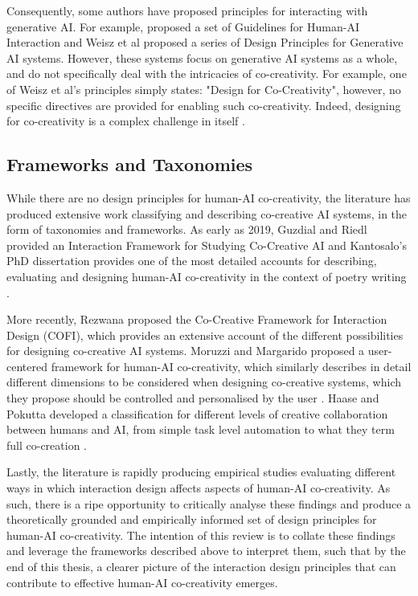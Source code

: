 Consequently, some authors have proposed principles for interacting with generative AI. For example, \cite{Amershi2019-wu} proposed a set of Guidelines for Human-AI Interaction and Weisz et al \cite{Weisz2024-io} proposed a series of Design Principles for Generative AI systems. However, these systems focus on generative AI systems as a whole, and do not specifically deal with the intricacies of co-creativity. For example, one of Weisz et al's principles simply states: "Design for Co-Creativity", however, no specific directives are provided for enabling such co-creativity. Indeed, designing for co-creativity is a complex challenge in itself \cite{Buschek2021-ks}. 

\subsection{Frameworks and Taxonomies}

While there are no design principles for human-AI co-creativity, the literature has produced extensive work classifying and describing co-creative AI systems, in the form of taxonomies and frameworks. As early as 2019, Guzdial and Riedl provided an Interaction Framework for Studying Co-Creative AI \cite{Guzdial2019-gr} and Kantosalo's PhD dissertation provides one of the most detailed accounts for describing, evaluating and designing human-AI co-creativity in the context of poetry writing \cite{Kantosalo2019-pz}. 

More recently, Rezwana \cite{Rezwana2022-gg} proposed the Co-Creative Framework for Interaction Design (COFI), which provides an extensive account of the different possibilities for designing co-creative AI systems. Moruzzi and Margarido proposed a user-centered framework for human-AI co-creativity, which similarly describes in detail different dimensions to be considered when designing co-creative systems, which they propose should be controlled and personalised by the user \cite{Moruzzi2024-cq}. Haase and Pokutta developed a classification for different levels of creative collaboration between humans and AI, from simple task level automation to what they term full co-creation \cite{Haase2024-yp}. 

Lastly, the literature is rapidly producing empirical studies evaluating different ways in which interaction design affects aspects of human-AI co-creativity. As such, there is a ripe opportunity to critically analyse these findings and produce a theoretically grounded and empirically informed set of design principles for human-AI co-creativity. The intention of this review is to collate these findings and leverage the frameworks described above to interpret them, such that by the end of this thesis, a clearer picture of the interaction design principles that can contribute to effective human-AI co-creativity emerges. 

